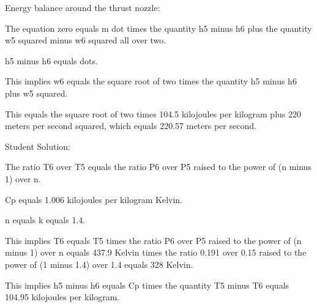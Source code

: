 Energy balance around the thrust nozzle:

The equation zero equals m dot times the quantity h5 minus h6 plus the quantity w5 squared minus w6 squared all over two.

h5 minus h6 equals dots.

This implies w6 equals the square root of two times the quantity h5 minus h6 plus w5 squared.

This equals the square root of two times 104.5 kilojoules per kilogram plus 220 meters per second squared, which equals 220.57 meters per second.

Student Solution:

The ratio T6 over T5 equals the ratio P6 over P5 raised to the power of (n minus 1) over n.

Cp equals 1.006 kilojoules per kilogram Kelvin.

n equals k equals 1.4.

This implies T6 equals T5 times the ratio P6 over P5 raised to the power of (n minus 1) over n equals 437.9 Kelvin times the ratio 0.191 over 0.15 raised to the power of (1 minus 1.4) over 1.4 equals 328 Kelvin.

This implies h5 minus h6 equals Cp times the quantity T5 minus T6 equals 104.95 kilojoules per kilogram.